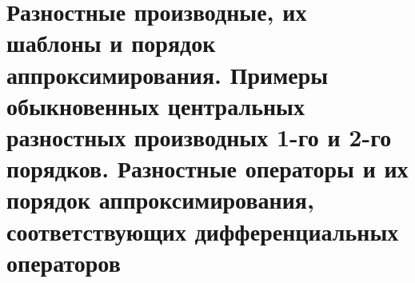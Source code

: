 \documentclass[__main__.tex]{subfiles}
\begin{document}
\section{Разностные производные, их шаблоны и порядок аппроксимирования. Примеры обыкновенных центральных разностных производных 1-го и 2-го порядков. Разностные операторы и их порядок аппроксимирования, соответствующих дифференциальных операторов}
\end{document}
